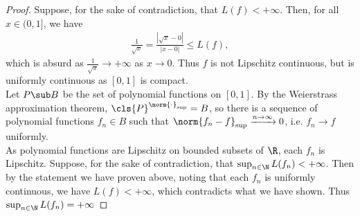 \documentclass[12pt]{article}
\begin{document}
\begin{homeworkProblem}
\begin{proof}
  Suppose, for the sake of contradiction, that $ L(f) <+\infty $. Then, for all $ x\in (0,1] $, we have 
  \begin{align*}
    \frac{1}{\sqrt{x}} = \frac{|\sqrt{x}-0|}{|x-0|}  \leq L(f),
  \end{align*}
  which is absurd as $ \frac{1}{\sqrt{x}}\to +\infty $  as $ x\to 0 $. Thus $ f $ is not Lipschitz continuous, but is uniformly continuous as $ [0,1] $ is compact.\\

  Let $ P\sub B $ be the set of polynomial functions on $ [0,1] $. By the Weierstrass approximation theorem, $ \cls{P}^{\norm{\cdot}_{\sup}} = B $, so there is a sequence of polynomial functions $ f_{n}\in B $ such that $ \norm{f_{n}-f}_{\sup} \xrightarrow{n\to\infty}0 $, i.e. $ f_{n}\to f $ uniformly.\\

  As polynomial functions are Lipschitz on bounded subsets of $ \R $, each $ f_{n} $ is Lipschitz. Suppose, for the sake of contradiction, that $ \sup_{n\in \N} L(f_{n}) <+\infty $. Then by the statement we have proven above, noting that each $ f_{n} $  is uniformly continuous, we have $ L(f)<+\infty $, which contradicts what we have shown. Thus $ \sup_{n\in \N} L(f_{n}) = +\infty $
\end{proof}
\end{homeworkProblem}
\end{document}
